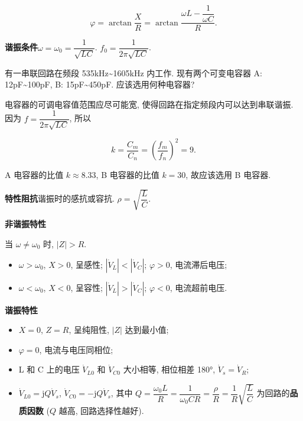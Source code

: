 \begin{equation}
    \varphi=\arctan\frac{X}{R}=\arctan\frac{\omega L-\dfrac{1}{\omega C}}{R}.
\end{equation}

\textbf{谐振条件}\quad $\omega=\omega_0=\dfrac{1}{\sqrt{LC}}$. $f_0=\dfrac{1}{2\pi\sqrt{LC}}$.

\begin{exampleprob}
    有一串联回路在频段 535kHz\textasciitilde 1605kHz 内工作. 现有两个可变电容器 A: 12pF\textasciitilde 100pF, B: 15pF\textasciitilde 450pF. 应该选用何种电容器?

    \begin{solution}
        电容器的可调电容值范围应尽可能宽, 使得回路在指定频段内可以达到串联谐振. 因为 $f=\dfrac{1}{2\pi\sqrt{LC}}$, 所以

        \begin{equation*}
            k=\frac{C_m}{C_n}=\left(\frac{f_m}{f_n}\right)^2=9.
        \end{equation*}

        A 电容器的比值 $k\approx 8.33$, B 电容器的比值 $k=30$, 故应该选用 B 电容器.
    \end{solution}
\end{exampleprob}

\textbf{特性阻抗}\quad 谐振时的感抗或容抗. $\rho=\sqrt{\dfrac{L}{C}}$.

\textbf{非谐振特性}

当 $\omega\neq\omega_0$ 时, $|Z|>R$.

\begin{itemize}
    \item $\omega>\omega_0$, $X>0$, 呈感性; $|\dot{V}_L|<|\dot{V}_C|$; $\varphi>0$, 电流滞后电压;
    \item $\omega<\omega_0$, $X<0$, 呈容性; $|\dot{V}_L|>|\dot{V}_C|$; $\varphi<0$, 电流超前电压.
\end{itemize}

\textbf{谐振特性}

\begin{itemize}
    \item $X=0$, $Z=R$, 呈纯阻性, $|Z|$ 达到最小值;
    \item $\varphi=0$, 电流与电压同相位;
    \item L 和 C 上的电压 $\dot{V}_{L0}$ 和 $\dot{V}_{C0}$ 大小相等, 相位相差 180°, $\dot{V}_s=\dot{V}_R$;
    \item $\dot{V}_{L0}=\mathrm{j}Q\dot{V}_s$, $\dot{V}_{C0}=-\mathrm{j}Q\dot{V}_s$, 其中 $Q=\dfrac{\omega_0L}{R}=\dfrac{1}{\omega_0CR}=\dfrac{\rho}{R}=\dfrac{1}{R}\sqrt{\dfrac{L}{C}}$ 为回路的\textbf{品质因数} ($Q$ 越高, 回路选择性越好).
\end{itemize}

